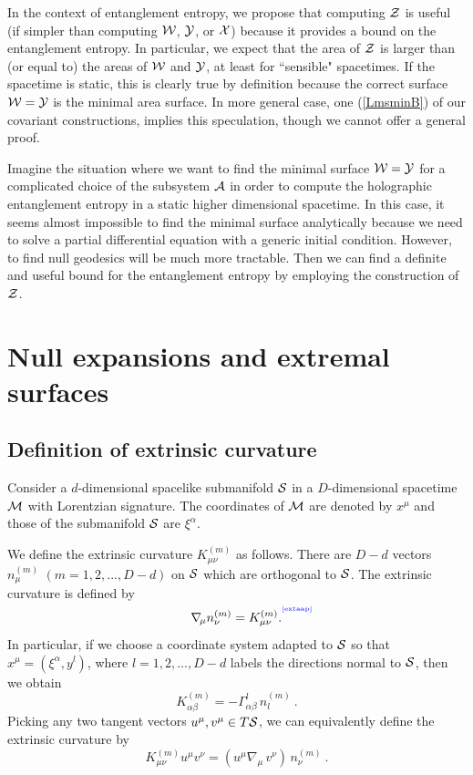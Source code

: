 \documentclass[12pt]{article}
\newcommand{\be}{\begin{equation}}
\newcommand{\ee}{\end{equation}}
\def\req#1{(\ref{#1})}
\def\a{\alpha}
\def\CA{{\cal A}}
\def\CS{{\cal S}}
\def\CW{{\cal W}}
\def\CX{{\cal X}}
\def\CY{{\cal Y}}
\def\CZ{{\cal Z}}
\def\Label#1{\label{#1}%
{ \color{blue}{\smash{\hbox to0pt{\raise2ex\hbox{\tiny[#1]}\hss}}}}}
\def\bulk{{\cal M}}
\def\ms{\CS}
\def\Gms{\CW}
\def\Lms{\CY}
\def\Xms{\CX}
\def\Cms{\CZ}
\def\rA{\CA}
\def\ap{\alpha}
\begin{document}
In the context of entanglement entropy, we propose that computing
$\Cms$ is useful (if simpler than computing $\Gms$, $\Lms$, or
$\Xms$) because it provides a bound on the entanglement entropy. In
particular, we expect that the area of $\Cms$ is larger than (or
equal to) the areas of $\Gms$ and $\Lms$, at least for ``sensible"
spacetimes. If the spacetime is static, this is clearly true by
definition because the correct surface $\Gms=\Lms$ is the minimal
area surface. In more general case, one \req{LmsminB} of our
covariant constructions, implies this speculation, though we cannot
offer a general proof.

Imagine the situation where we want to find the minimal surface
$\Gms=\Lms$ for a complicated choice of the subsystem $\rA$ in order to
compute the holographic entanglement entropy in a static higher
dimensional spacetime. In this case, it seems almost impossible to
find the minimal surface analytically because we need to solve a
partial differential equation with a generic initial condition.
 However, to find null
geodesics will be much more tractable. Then we can find a definite
and useful bound for the entanglement entropy by employing the
construction of $\Cms$.


\section{Null expansions and extremal surfaces}
\label{apmin}


\subsection{Definition of extrinsic curvature}

Consider a $d$-dimensional spacelike submanifold $\ms$ in a
$D$-dimensional spacetime $\bulk$ with Lorentzian signature.
The coordinates of $\bulk$ are denoted by $x^\mu$ and those of the submanifold $\ms$ are $\xi^\a$.

We define the extrinsic curvature $K^{(m)}_{\mu\nu}$ as follows.
There are $D-d$ vectors  $n^{(m)}_\mu$ $(m=1,2,...,D-d)$ on $\ms$ which are
 orthogonal to $\ms$. The extrinsic curvature
is defined by
%
\be \nabla_{\! \mu}n^{(m)}_\nu=K^{(m)}_{\mu\nu}. \Label{extaap} \ee
%
In particular, if we choose
a coordinate system adapted to ${\cal S}$ so that
$x^\mu=(\xi^\ap,y^l)$, where $l=1,2,...,D-d$ labels the directions
normal to $\ms$, then we obtain
%
\be K^{(m)}_{\ap\beta}=-\Gamma^l_{\ap\beta}\, n^{(m)}_{l}\ . \ee
%
Picking  any two tangent vectors $u^\mu, v^\mu \in T\ms$, we
can equivalently define the extrinsic curvature by
%
\be K^{(m)}_{\mu\nu}u^\mu v^\nu=(u^\mu\nabla_{\! \mu} \, v^\nu)\,
n^{(m)}_\nu \ . \ee
%
\end{document}
